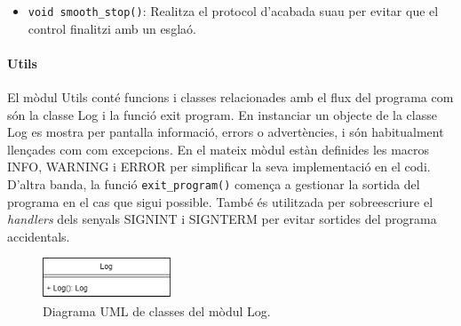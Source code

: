 {{{\begin{itemize}
                \item \lstinline{void smooth_stop()}:
                    Realitza el protocol d'acabada suau per evitar que el
                    control finalitzi amb un esglaó.

            \end{itemize}
        } 

        \paragraph{Utils} 
        { 
            El mòdul Utils conté funcions i classes relacionades amb el flux del
            programa com són la classe Log i la funció exit program. En
            instanciar un objecte de la classe Log es mostra per pantalla
            informació, errors o advertències, i són habitualment llençades com
            com excepcions. En el mateix mòdul estàn definides les macros INFO,
            WARNING i ERROR per simplificar la seva implementació en el codi.
            D'altra banda, la funció \lstinline{exit_program()} comença a gestionar la
            sortida del programa en el cas que sigui possible. També és
            utilitzada per sobreescriure el \emph{handlers} dels senyals
            SIGNINT i SIGNTERM per evitar sortides del programa accidentals.
        
            \begin{figure}[!htb]
                \centering
                \captionsetup{justification=centering, margin=1.5cm}
                \includegraphics[width=3.8cm]
                    { img/4_implementacio/uml_log.png }
                \caption{ Diagrama UML de classes del mòdul Log. }
            \end{figure}
        } 
    }
}

